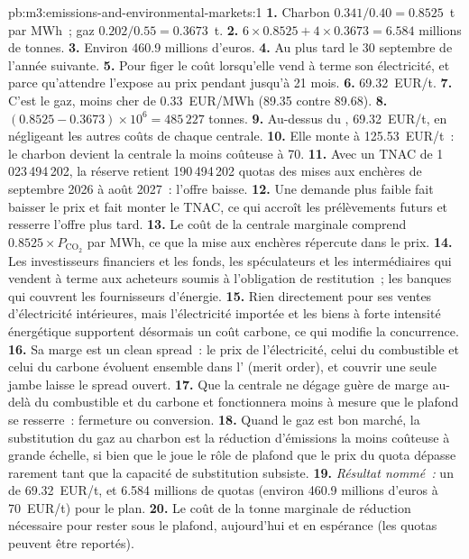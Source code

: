 \begin{solution}{pb:m3:emissions-and-environmental-markets:1}
\textbf{1.} Charbon $0.341/0.40 = 0.8525$~t par MWh~; gaz $0.202/0.55 = 0.3673$~t. \textbf{2.} $6 \times
0.8525 + 4 \times 0.3673 = 6.584$ millions de tonnes. \textbf{3.} Environ 460.9 millions d'euros. \textbf{4.} Au plus tard le
30 septembre de l'année suivante. \textbf{5.} Pour figer le coût lorsqu'elle vend à terme son électricité, et parce
qu'attendre l'expose au prix pendant jusqu'à 21 mois.
\textbf{6.} \qty{69.32}{EUR/t}. \textbf{7.} C'est le gaz, moins cher de \qty{0.33}{EUR/MWh} (89.35 contre 89.68).
\textbf{8.} $(0.8525 - 0.3673) \times 10^6 = 485\,227$ tonnes. \textbf{9.} Au-dessus du ,
\qty{69.32}{EUR/t}, en négligeant les autres coûts de chaque centrale. \textbf{10.} Elle monte à \qty{125.53}{EUR/t}~:
le charbon devient la centrale la moins coûteuse à \qty{70}{}.
\textbf{11.} Avec un TNAC de 1\,023\,494\,202, la réserve retient 190\,494\,202 quotas des
mises aux enchères de septembre 2026 à août 2027~: l'offre baisse. \textbf{12.} Une demande plus faible fait baisser le prix
et fait monter le TNAC, ce qui accroît les prélèvements futurs et resserre l'offre plus tard. \textbf{13.} Le coût de la centrale marginale
comprend $0.8525 \times P_{\mathrm{CO_2}}$ par MWh, ce que la mise aux enchères répercute dans le prix.
\textbf{14.} Les investisseurs financiers et les fonds, les spéculateurs et les intermédiaires qui vendent à terme aux
acheteurs soumis à l'obligation de restitution~; les banques qui couvrent les fournisseurs d'énergie. \textbf{15.} Rien directement pour ses ventes
d'électricité intérieures, mais l'électricité importée et les biens à forte intensité énergétique supportent désormais un coût carbone, ce qui modifie la
concurrence. \textbf{16.} Sa marge est un clean spread~: le prix de l'électricité, celui du combustible et celui du carbone évoluent ensemble
dans l' (merit order), et couvrir une seule jambe laisse le spread ouvert. \textbf{17.} Que la
centrale ne dégage guère de marge au-delà du combustible et du carbone et fonctionnera moins à mesure que le plafond se resserre~: fermeture ou conversion. \textbf{18.}
Quand le gaz est bon marché, la substitution du gaz au charbon est la réduction d'émissions la moins coûteuse à grande échelle, si bien que le  joue le rôle de
plafond que le prix du quota dépasse rarement tant que la capacité de substitution subsiste. \textbf{19.}
\emph{Résultat nommé~:} un  de \qty{69.32}{EUR/t}, et 6.584 millions de quotas (environ
460.9 millions d'euros à \qty{70}{EUR/t}) pour le plan. \textbf{20.} Le coût de la tonne marginale
de réduction nécessaire pour rester sous le plafond, aujourd'hui et en espérance (les quotas peuvent être reportés).
\end{solution}

